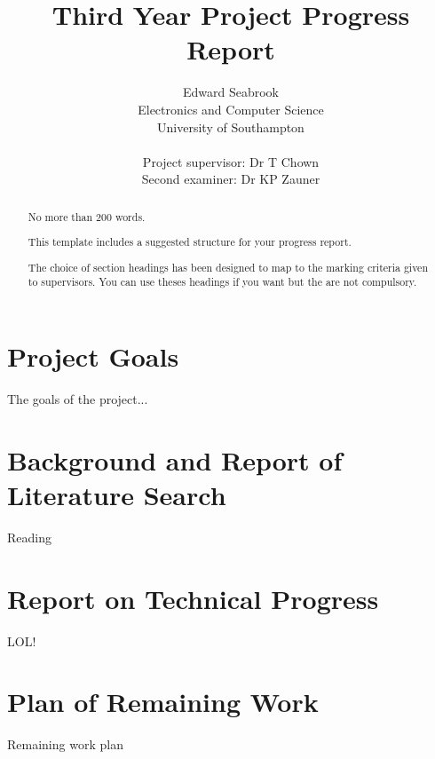 \documentclass[12pt]{report}
\author{Edward Seabrook \\ 
Electronics and Computer Science \\ 
University of Southampton \\ \\
Project supervisor: Dr T Chown \\
Second examiner: Dr KP Zauner}
\title{Third Year Project Progress Report}
\begin{document}



\begin{abstract}
No more than 200 words. 

This  template includes a suggested structure for your progress report.

The choice of section headings has been designed to map to the marking criteria given to supervisors. You can use theses headings if you want but the are not compulsory. 
\end{abstract}




\tableofcontents



\chapter{Project Goals}
The goals of the project...

\chapter{Background and Report of Literature Search}
Reading

\chapter{Report on Technical Progress}
LOL!

\chapter{Plan of Remaining Work}
Remaining work plan
\end{document}
